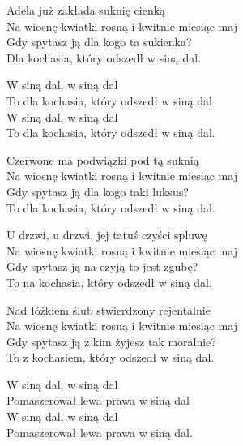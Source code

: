 \begin{text}
    Adela już zakłada suknię cienką\\
    Na wiosnę kwiatki rosną i kwitnie miesiąc maj\\
    Gdy spytasz ją dla kogo ta sukienka?\\
    Dla kochasia, który odszedł w siną dal.

    \vin W siną dal, w siną dal\\
    \vin To dla kochasia, który odszedł w siną dal\\
    \vin W siną dal, w siną dal\\ 
    \vin To dla kochasia, który odszedł w siną dal.

    Czerwone ma podwiązki pod tą suknią\\
    Na wiosnę kwiatki rosną i kwitnie miesiąc maj\\
    Gdy spytasz ją dla kogo taki luksus?\\
    To dla kochasia, który odszedł w siną dal.

    U drzwi, u drzwi, jej tatuś czyści spluwę\\
    Na wiosnę kwiatki rosną i kwitnie miesiąc maj\\
    Gdy spytasz ją na czyją to jest zgubę?\\
    To na kochasia, który odszedł w siną dal.  

    Nad łóżkiem ślub stwierdzony rejentalnie\\
    Na wiosnę kwiatki rosną i kwitnie miesiąc maj\\
    Gdy spytasz ją z kim żyjesz tak moralnie?\\
    To z kochasiem, który odszedł w siną dal.

    \vin W siną dal, w siną dal\\
    \vin Pomaszerował lewa prawa w siną dal\\
    \vin W siną dal, w siną dal\\ 
    \vin Pomaszerował lewa prawa w siną dal.

\end{text}
